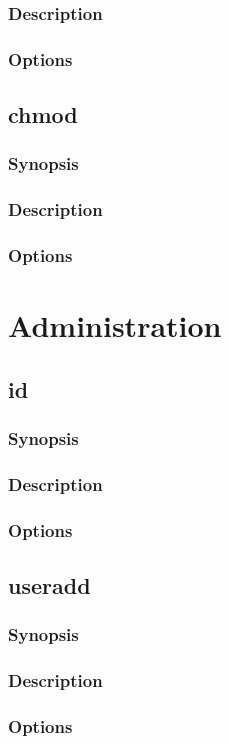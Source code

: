 \documentclass[a4paper, 10pt, onecolumn, openright, oneside]{book}
\begin{document}
			\subsection{Description}
			\subsection{Options}
		\section{chmod}
			\subsection{Synopsis}
			\subsection{Description}
			\subsection{Options}
	\chapter{Administration}
		\section{id}
			\subsection{Synopsis}
			\subsection{Description}
			\subsection{Options}
		\section{useradd}
			\subsection{Synopsis}
			\subsection{Description}
			\subsection{Options}
\end{document}

